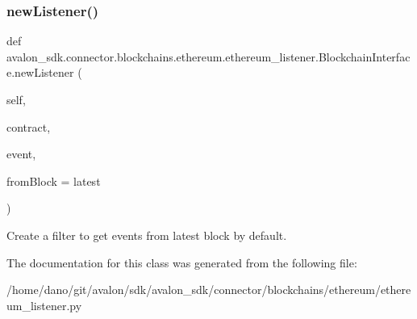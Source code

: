 \subsubsection{\texorpdfstring{new\+Listener()}{newListener()}}
{\footnotesize\ttfamily def avalon\+\_\+sdk.\+connector.\+blockchains.\+ethereum.\+ethereum\+\_\+listener.\+Blockchain\+Interface.\+new\+Listener (\begin{DoxyParamCaption}\item[{}]{self,  }\item[{}]{contract,  }\item[{}]{event,  }\item[{}]{from\+Block = {\ttfamily \textquotesingle{}latest\textquotesingle{}} }\end{DoxyParamCaption})}

\begin{DoxyVerb}Create a filter to get events from latest block by default.\end{DoxyVerb}
 

The documentation for this class was generated from the following file\+:\begin{DoxyCompactItemize}
\item 
/home/dano/git/avalon/sdk/avalon\+\_\+sdk/connector/blockchains/ethereum/ethereum\+\_\+listener.\+py\end{DoxyCompactItemize}
